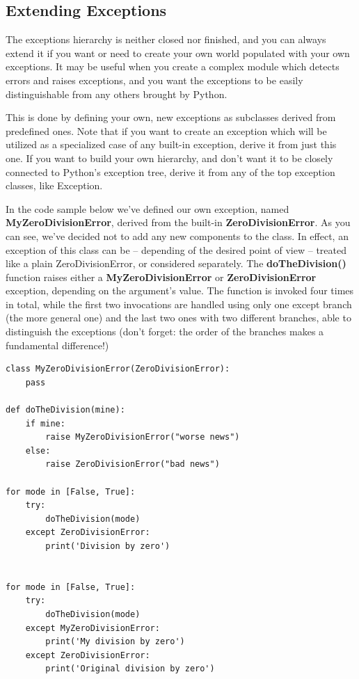 \documentclass[11pt]{article}
\begin{document}
\subsection{Extending Exceptions}
\label{sec:org2dbc719}
The exceptions hierarchy is neither closed nor finished, and you can
always extend it if you want or need to create your own world
populated with your own exceptions. It may be useful when you create a
complex module which detects errors and raises exceptions, and you
want the exceptions to be easily distinguishable from any others
brought by Python.

This is done by defining your own, new exceptions as subclasses
derived from predefined ones.  Note that if you want to create an
exception which will be utilized as a specialized case of any built-in
exception, derive it from just this one. If you want to build your own
hierarchy, and don’t want it to be closely connected to Python’s
exception tree, derive it from any of the top exception classes, like
Exception.

In the code sample below we’ve defined our own exception, named
\textbf{MyZeroDivisionError}, derived from the built-in
\textbf{ZeroDivisionError}. As you can see, we’ve decided not to add any new
components to the class. In effect, an exception of this class can be
– depending of the desired point of view – treated like a plain
ZeroDivisionError, or considered separately.  The \textbf{doTheDivision()}
function raises either a \textbf{MyZeroDivisionError} or \textbf{ZeroDivisionError}
exception, depending on the argument’s value. The function is invoked
four times in total, while the first two invocations are handled using
only one except branch (the more general one) and the last two ones
with two different branches, able to distinguish the exceptions (don’t
forget: the order of the branches makes a fundamental difference!)

\begin{verbatim}
class MyZeroDivisionError(ZeroDivisionError):
	pass

def doTheDivision(mine):
	if mine:
		raise MyZeroDivisionError("worse news")
	else:		
		raise ZeroDivisionError("bad news")

for mode in [False, True]:
	try:
		doTheDivision(mode)
	except ZeroDivisionError:
		print('Division by zero')


for mode in [False, True]:
	try:
		doTheDivision(mode)
	except MyZeroDivisionError:
		print('My division by zero')
	except ZeroDivisionError:
		print('Original division by zero')		
\end{verbatim}
\end{document}
